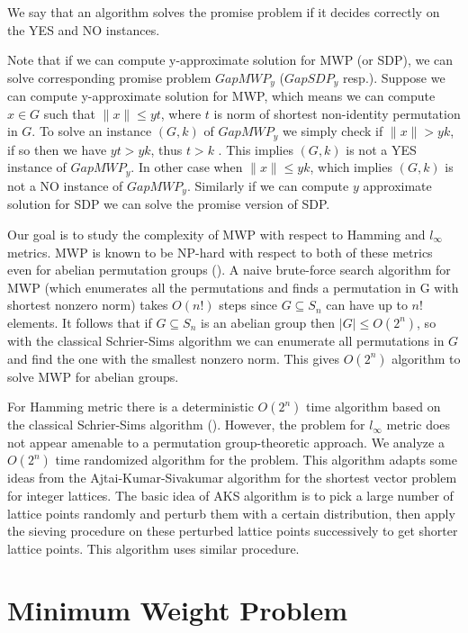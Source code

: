 \documentclass[12pt]{report}
\begin{document}
We say that an algorithm solves the promise problem if it decides correctly on the YES and NO instances.

Note that if we can compute y-approximate solution for MWP (or SDP), we can solve corresponding promise problem $GapMWP_y$ ($GapSDP_y$ resp.). Suppose we can compute y-approximate solution for MWP, which means we can compute $x \in G$ such that $\|x\| \leq yt$, where $t$ is norm of shortest non-identity permutation in $G$. To solve an instance $(G, k)$ of $GapMWP_y$ we simply check if $\|x\| > yk$, if so then we have $yt > yk$, thus $t > k$ . This implies $(G, k)$ is not a YES instance of $GapMWP_y$. In other case when $\|x\| \leq yk$, which implies $(G, k)$ is not a NO instance of $GapMWP_y$. Similarly if we can compute $y$ approximate solution for SDP we can solve the promise version of SDP.

Our goal is to study the complexity of MWP with respect to Hamming and $l_{\infty}$ metrics. MWP is known to be NP-hard with respect to both of these metrics even for abelian permutation groups (\cite{Arvind}). A naive brute-force search algorithm for MWP (which enumerates all the permutations and finds a permutation in G with shortest nonzero norm) takes $O(n!)$ steps since $G \subseteq S_n$ can have up to $n!$ elements. It follows that if $G\subseteq S_n$ is an abelian group then $|G| \leq O(2^n)$, so with the classical Schrier-Sims algorithm we can enumerate all permutations in $G$ and find the one with the smallest nonzero norm. This gives $O(2^n)$ algorithm to solve MWP for abelian groups.

For Hamming metric there is a deterministic $O(2^n)$ time algorithm based on the classical Schrier-Sims algorithm (\cite{Arvind}). However, the problem for $l_{\infty}$ metric does not appear amenable to a permutation group-theoretic approach. We analyze a $O(2^n)$ time randomized algorithm for the problem. This algorithm adapts some ideas from the Ajtai-Kumar-Sivakumar algorithm for the shortest vector problem for integer lattices. The basic idea of AKS algorithm is to pick a large number of lattice points randomly and perturb them with a certain distribution, then apply the sieving procedure on these perturbed lattice points successively to get shorter lattice points. This algorithm uses similar procedure.

\newpage


\chapter{Minimum Weight Problem}
\end{document}
